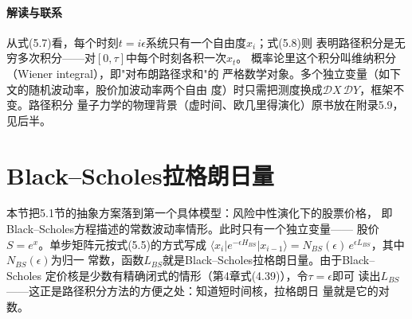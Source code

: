 \paragraph{解读与联系}
从式(5.7)看，每个时刻$t=i\epsilon$系统只有一个自由度$x_i$；式(5.8)则
表明路径积分是无穷多次积分——对$[0,\tau]$中每个时刻各积一次$x_t$。
概率论里这个积分叫维纳积分（Wiener integral），即"对布朗路径求和"的
严格数学对象。多个独立变量（如下文的随机波动率，股价加波动率两个自由
度）时只需把测度换成$\mathcal{D}X\,\mathcal{D}Y$，框架不变。路径积分
量子力学的物理背景（虚时间、欧几里得演化）原书放在附录5.9，见后半。

\section{Black--Scholes拉格朗日量}

本节把5.1节的抽象方案落到第一个具体模型：风险中性演化下的股票价格，
即Black--Scholes方程描述的常数波动率情形。此时只有一个独立变量——
股价$S=e^{x}$。单步矩阵元按式(5.5)的方式写成
$\langle x_{i}\vert e^{-\epsilon H_{BS}}\vert x_{i-1}\rangle
=N_{BS}(\epsilon)\,e^{\epsilon L_{BS}}$，其中$N_{BS}(\epsilon)$为归一
常数，函数$L_{BS}$就是Black--Scholes拉格朗日量。由于Black--Scholes
定价核是少数有精确闭式的情形（第4章式(4.39)），令$\tau=\epsilon$即可
读出$L_{BS}$——这正是路径积分方法的方便之处：知道短时间核，拉格朗日
量就是它的对数。

